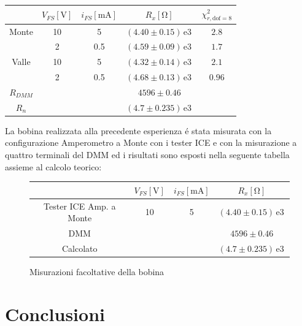\documentclass{article}
\newcommand{\E}[1]{\, \mathrm{e}{#1} \, }
\begin{document}
\begin{center}
\begin{tabular}{c|c|c|c|c}
	& $V_{FS} [\si{\volt}]$ & $i_{FS} [\si{\milli\ampere}]$ & $R_x [\si{\ohm}]$ & $\chi ^2_{r,\mathrm{dof}=8}$ \\
	\hline
	Monte 
	& 10 & 5 & $(4.40 \pm 0.15)\E{3}$ & $2.8$ \\
	& 2 & 0.5 & $(4.59 \pm 0.09)\E{3}$ & $1.7$ \\
	Valle 
	& 10 & 5 & $(4.32 \pm 0.14)\E{3}$ & $2.1$ \\
	& 2 & 0.5 & $(4.68 \pm 0.13)\E{3}$ & $0.96$ \\
	$R_{DMM}$ &  &  & $4596 \pm 0.46$ &  \\
	$R_n$ &  &  & $(4.7 \pm 0.235) \E{3}$ & 
\end{tabular}
\end{center}

La bobina realizzata alla precedente esperienza \'e stata misurata con la configurazione Amperometro a Monte con i tester ICE e con la misurazione a quattro terminali del DMM ed i risultati sono esposti nella seguente tabella assieme al calcolo teorico:
\begin{center}
\begin{figure}
\centering
\begin{tabular}{c|c|c|c}
	& $V_{FS} [\si{\volt}]$ & $i_{FS} [\si{\milli\ampere}]$ & $R_x [\si{\ohm}]$\\
	\hline
	Tester ICE Amp. a Monte 
	& 10 & 5 & $(4.40 \pm 0.15)\E{3}$ \\
	DMM &  &  & $4596 \pm 0.46$\\
	Calcolato &  &  & $(4.7 \pm 0.235) \E{3}$
	
\end{tabular}
\caption{Misurazioni facoltative della bobina}
\end{figure}
\end{center}

\section{Conclusioni}
\end{document}
